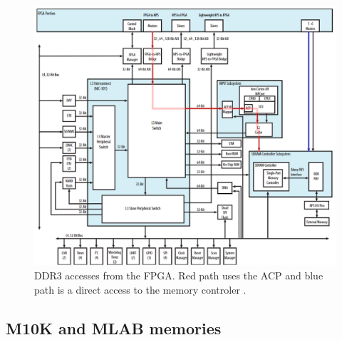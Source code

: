\begin{figure}[H]
    \centering
    \includegraphics[scale=0.4]{Chapter1-Hardware/res/de10_DDR3.PNG}
    \caption{DDR3 accesses from the FPGA. Red path uses the ACP and blue path is a direct access
    to the memory controler \cite{hps}.}
    \label{fig:de10/ddr3}
\end{figure}

\subsection{M10K and MLAB memories}


